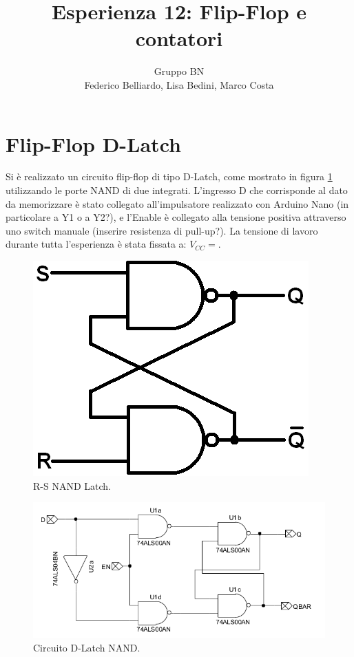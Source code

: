 \documentclass[10pt,a4paper]{article}
\author{Gruppo BN \\ Federico Belliardo, Lisa Bedini, Marco Costa}
\title{Esperienza 12: Flip-Flop e contatori}
\begin{document}
\maketitle

\section{Flip-Flop D-Latch}
Si è realizzato un circuito flip-flop di tipo D-Latch, come mostrato in figura \ref{latch} utilizzando le porte NAND di due integrati. L'ingresso D che corrisponde al dato da memorizzare è stato collegato all'impulsatore realizzato con Arduino Nano (in particolare a Y1 o a Y2?), e l'Enable è collegato alla tensione positiva attraverso uno switch manuale (inserire resistenza di pull-up?). La tensione di lavoro durante tutta l'esperienza è stata fissata a: $V_{CC} = $.\\


\begin{figure}
\centering
\includegraphics[scale=0.5]{latchNand.png}
\caption{R-S NAND Latch.\label{latch}}
\end{figure}

\begin{figure}
\centering
\includegraphics[scale=0.7]{flipflopDlatch.png}
\caption{Circuito  D-Latch NAND.\label{circuito}}
\end{figure}
\end{document}
